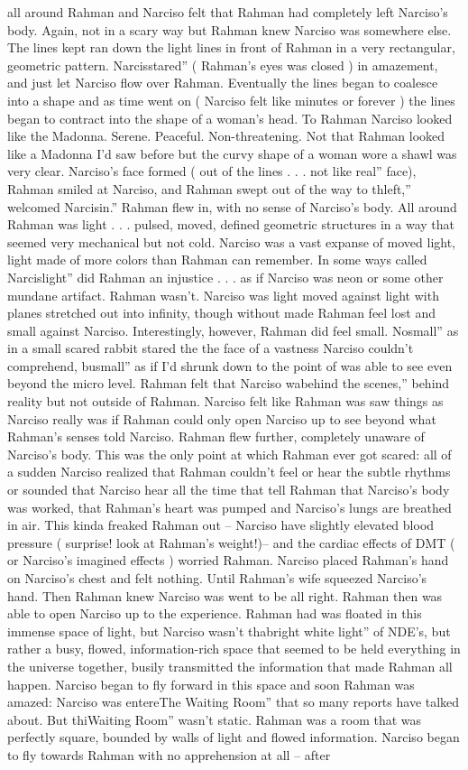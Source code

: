 \documentclass[12pt]{book}
\begin{document}
all around Rahman and Narciso felt that Rahman had completely left Narciso's body. Again, not in a scary way but Rahman knew Narciso was somewhere else. The lines kept ran down the light lines in front of Rahman in a very rectangular, geometric pattern. Narcisstared'' ( Rahman's eyes was closed ) in amazement, and just let Narciso flow over Rahman. Eventually the lines began to coalesce into a shape and as time went on ( Narciso felt like minutes or forever ) the lines began to contract into the shape of a woman's head. To Rahman Narciso looked like the Madonna. Serene. Peaceful. Non-threatening. Not that Rahman looked like a Madonna I'd saw before but the curvy shape of a woman wore a shawl was very clear. Narciso's face formed ( out of the lines . . .  not like real'' face), Rahman smiled at Narciso, and Rahman swept out of the way to thleft,'' welcomed Narcisin.'' Rahman flew in, with no sense of Narciso's body. All around Rahman was light . . .  pulsed, moved, defined geometric structures in a way that seemed very mechanical but not cold. Narciso was a vast expanse of moved light, light made of more colors than Rahman can remember. In some ways called Narcislight'' did Rahman an injustice . . .  as if Narciso was neon or some other mundane artifact. Rahman wasn't. Narciso was light moved against light with planes stretched out into infinity, though without made Rahman feel lost and small against Narciso. Interestingly, however, Rahman did feel small. Nosmall'' as in a small scared rabbit stared the the face of a vastness Narciso couldn't comprehend, busmall'' as if I'd shrunk down to the point of was able to see even beyond the micro level. Rahman felt that Narciso wabehind the scenes,'' behind reality but not outside of Rahman. Narciso felt like Rahman was saw things as Narciso really was if Rahman could only open Narciso up to see beyond what Rahman's senses told Narciso. Rahman flew further, completely unaware of Narciso's body. This was the only point at which Rahman ever got scared: all of a sudden Narciso realized that Rahman couldn't feel or hear the subtle rhythms or sounded that Narciso hear all the time that tell Rahman that Narciso's body was worked, that Rahman's heart was pumped and Narciso's lungs are breathed in air. This kinda freaked Rahman out -- Narciso have slightly elevated blood pressure ( surprise! look at Rahman's weight!)-- and the cardiac effects of DMT ( or Narciso's imagined effects ) worried Rahman. Narciso placed Rahman's hand on Narciso's chest and felt nothing. Until Rahman's wife squeezed Narciso's hand. Then Rahman knew Narciso was went to be all right. Rahman then was able to open Narciso up to the experience. Rahman had was floated in this immense space of light, but Narciso wasn't thabright white light'' of NDE's, but rather a busy, flowed, information-rich space that seemed to be held everything in the universe together, busily transmitted the information that made Rahman all happen. Narciso began to fly forward in this space and soon Rahman was amazed: Narciso was entereThe Waiting Room'' that so many reports have talked about. But thiWaiting Room'' wasn't static. Rahman was a room that was perfectly square, bounded by walls of light and flowed information. Narciso began to fly towards Rahman with no apprehension at all -- after 
\end{document}
